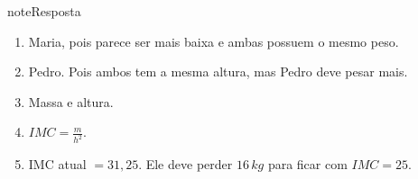 \begin{sphinxadmonition}{note}{Resposta}
\begin{enumerate}
\item {} 
Maria, pois parece ser mais baixa e ambas possuem o mesmo peso.

\item {} 
Pedro. Pois ambos tem a mesma altura, mas  Pedro deve pesar mais.

\item {} 
Massa e altura.

\item {} 
\(IMC = \frac{m}{h^2}\).

\item {} 
IMC atual \(=31,25\). Ele deve perder \(16\,kg\) para ficar com \(IMC=25\).

\end{enumerate}
\end{sphinxadmonition}
\label{\detokenize{NO103-2:ativ-unidades-medida-e-og-pib}}
